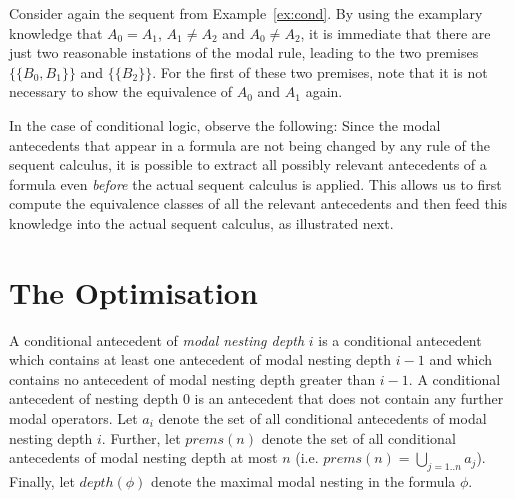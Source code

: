 \documentclass{entcs} \usepackage{entcsmacro}
\newcommand{\prems}{\mathit{prems}}
\begin{document}
\begin{example}
Consider again the sequent from Example~\ref{ex:cond}. By using the examplary
knowledge that $A_0=A_1$, $A_1\neq A_2$ and $A_0\neq A_2$, it is immediate
that there are just two reasonable instations of the modal rule, leading
to the two premises $\{\{B_0,B_1\}\}$ and $\{\{B_2\}\}$. For the
first of these two premises, note that it is not necessary to show the
equivalence of $A_0$ and $A_1$ again.
\end{example}


\noindent In the case of conditional logic, observe the following:
Since the modal antecedents that appear in a formula are not being
changed by any rule of the sequent calculus, it is possible to extract
all possibly relevant antecedents of a formula even \emph{before} the
actual sequent calculus is applied. This allows us to first compute
the equivalence classes of all the relevant antecedents and then feed
this knowledge into the actual sequent calculus, as illustrated next.

\section{The Optimisation}

\begin{definition}
A conditional antecedent of \emph{modal nesting depth} $i$ is a
conditional antecedent which contains at least one antecedent of
modal nesting depth $i-1$ and which contains no antecedent 
of modal nesting depth greater than $i-1$. A
conditional antecedent of nesting depth 0 is an antecedent
that does not contain any further modal operators.
Let $a_i$ denote the set of all conditional antecedents of modal
nesting depth $i$. Further, let $\prems(n)$ denote the set of all
conditional antecedents of modal nesting depth at most $n$ (i.e.
$\prems(n)=\bigcup_{j=1..n}^{} a_j$).
Finally, let $depth(\phi)$ denote the maximal modal nesting in
the formula $\phi$.
\end{definition}

\end{document}
